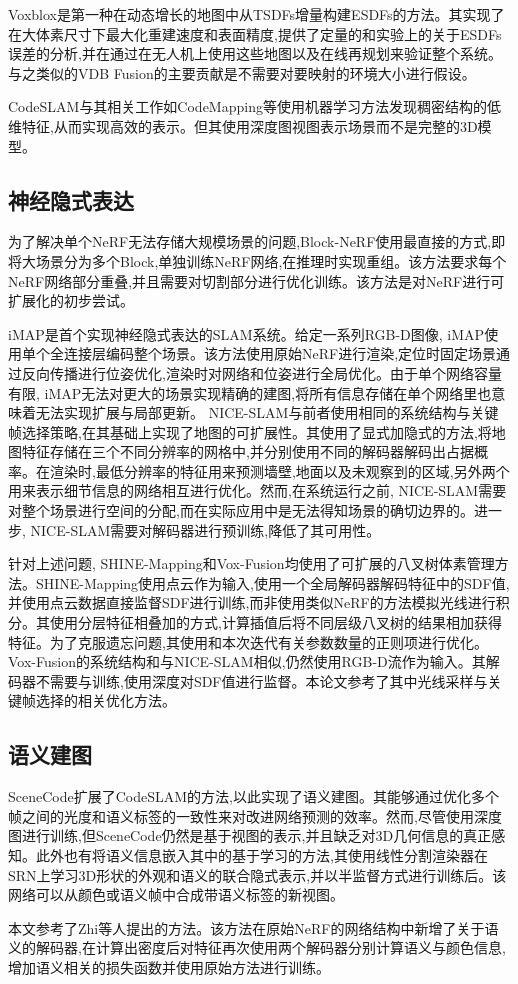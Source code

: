 Voxblox\cite{voxblox}是第一种在动态增长的地图中从TSDFs增量构建ESDFs的方法。其实现了在大体素尺寸下最大化重建速度和表面精度,提供了定量的和实验上的关于ESDFs误差的分析,并在通过在无人机上使用这些地图以及在线再规划来验证整个系统。与之类似的VDB Fusion\cite{vdbfusion}的主要贡献是不需要对要映射的环境大小进行假设。

CodeSLAM\cite{CodeSLAM}与其相关工作如CodeMapping\cite{codemapping}等使用机器学习方法发现稠密结构的低维特征,从而实现高效的表示。但其使用深度图视图表示场景而不是完整的3D模型。
\subsection{神经隐式表达}
为了解决单个NeRF无法存储大规模场景的问题,Block-NeRF\cite{block}使用最直接的方式,即将大场景分为多个Block,单独训练NeRF网络,在推理时实现重组。该方法要求每个NeRF网络部分重叠,并且需要对切割部分进行优化训练。该方法是对NeRF进行可扩展化的初步尝试。

iMAP\cite{imap}是首个实现神经隐式表达的SLAM系统。给定一系列RGB-D图像, iMAP使用单个全连接层编码整个场景。该方法使用原始NeRF进行渲染,定位时固定场景通过反向传播进行位姿优化,渲染时对网络和位姿进行全局优化。由于单个网络容量有限, iMAP无法对更大的场景实现精确的建图,将所有信息存储在单个网络里也意味着无法实现扩展与局部更新。 NICE-SLAM\cite{nice}与前者使用相同的系统结构与关键帧选择策略,在其基础上实现了地图的可扩展性。其使用了显式加隐式的方法,将地图特征存储在三个不同分辨率的网格中,并分别使用不同的解码器解码出占据概率。在渲染时,最低分辨率的特征用来预测墙壁,地面以及未观察到的区域,另外两个用来表示细节信息的网络相互进行优化。然而,在系统运行之前, NICE-SLAM需要对整个场景进行空间的分配,而在实际应用中是无法得知场景的确切边界的。进一步, NICE-SLAM需要对解码器进行预训练,降低了其可用性。

针对上述问题, SHINE-Mapping\cite{shine}和Vox-Fusion\cite{vox}均使用了可扩展的八叉树体素管理方法。SHINE-Mapping使用点云作为输入,使用一个全局解码器解码特征中的SDF值,并使用点云数据直接监督SDF进行训练,而非使用类似NeRF的方法模拟光线进行积分。其使用分层特征相叠加的方式,计算插值后将不同层级八叉树的结果相加获得特征。为了克服遗忘问题,其使用和本次迭代有关参数数量的正则项进行优化。Vox-Fusion的系统结构和与NICE-SLAM相似,仍然使用RGB-D流作为输入。其解码器不需要与训练,使用深度对SDF值进行监督。本论文参考了其中光线采样与关键帧选择的相关优化方法。

\subsection{语义建图}
SceneCode\cite{scenecode}扩展了CodeSLAM的方法,以此实现了语义建图。其能够通过优化多个帧之间的光度和语义标签的一致性来对改进网络预测的效率。然而,尽管使用深度图进行训练,但SceneCode仍然是基于视图的表示,并且缺乏对3D几何信息的真正感知。此外也有将语义信息嵌入其中的基于学习的方法\cite{semantic2},其使用线性分割渲染器在SRN上学习3D形状的外观和语义的联合隐式表示,并以半监督方式进行训练后。该网络可以从颜色或语义帧中合成带语义标签的新视图。

本文参考了Zhi等人提出的方法\cite{sem_nerf}。该方法在原始NeRF的网络结构中新增了关于语义的解码器,在计算出密度后对特征再次使用两个解码器分别计算语义与颜色信息,增加语义相关的损失函数并使用原始方法进行训练。